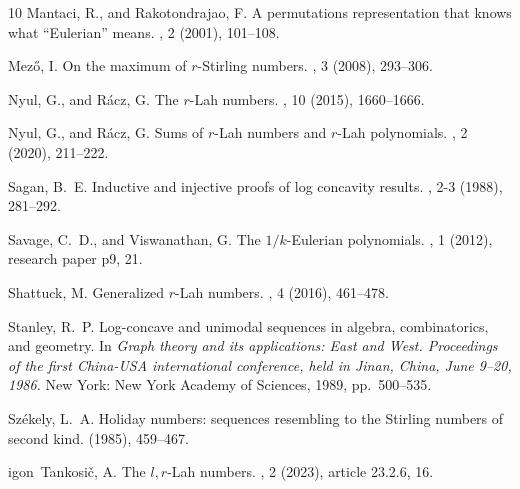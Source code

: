 \documentclass{article}
\theoremstyle{definition}
\numberwithin{equation}{section}
\begin{document}
\begin{thebibliography}{10}
{\sc Mantaci, R., and Rakotondrajao, F.}
\newblock A permutations representation that knows what ``{Eulerian}'' means.
, 2 (2001), 101--108.

{\sc Mez{\H{o}}, I.}
\newblock On the maximum of {{\(r\)}}-{Stirling} numbers.
, 3 (2008), 293--306.

{\sc Nyul, G., and R{\'a}cz, G.}
\newblock The {{\(r\)}}-{Lah} numbers.
, 10 (2015), 1660--1666.

{\sc Nyul, G., and R{\'a}cz, G.}
\newblock Sums of {{\(r\)}}-{Lah} numbers and {{\(r\)}}-{Lah} polynomials.
, 2 (2020), 211--222.

{\sc Sagan, B.~E.}
\newblock Inductive and injective proofs of log concavity results.
, 2-3 (1988), 281--292.

{\sc Savage, C.~D., and Viswanathan, G.}
\newblock The {{\({1/k}\)}}-{Eulerian} polynomials.
, 1 (2012), research paper p9, 21.

{\sc Shattuck, M.}
\newblock Generalized {{\(r\)}}-{Lah} numbers.
, 4 (2016), 461--478.

{\sc Stanley, R.~P.}
\newblock Log-concave and unimodal sequences in algebra, combinatorics, and geometry.
\newblock In {\em Graph theory and its applications: East and West. Proceedings of the first China-USA international conference, held in Jinan, China, June 9--20, 1986.} New York: New York Academy of Sciences, 1989, pp.~500--535.

{\sc Sz{\'e}kely, L.~A.}
\newblock Holiday numbers: sequences resembling to the {Stirling} numbers of second kind.
 (1985), 459--467.

{igon~Tankosi{\v{c}}, A.}
\newblock The {{\(l, r\)}}-{Lah} numbers.
, 2 (2023), article 23.2.6, 16.

\end{thebibliography}

\end{document}
